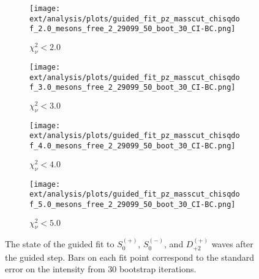 \begin{figure}[htbp]
    \centering
    \begin{subfigure}{0.45\textwidth}
        \texttt{[image: ext/analysis/plots/guided\_fit\_pz\_masscut\_chisqdof\_2.0\_mesons\_free\_2\_29099\_50\_boot\_30\_CI-BC.png]}
        \caption{$\chi^2_\nu < 2.0$}
    \end{subfigure}
    \hfill
    \begin{subfigure}{0.45\textwidth}
        \texttt{[image: ext/analysis/plots/guided\_fit\_pz\_masscut\_chisqdof\_3.0\_mesons\_free\_2\_29099\_50\_boot\_30\_CI-BC.png]}
        \caption{$\chi^2_\nu < 3.0$}
    \end{subfigure}
    \vspace{1em}
    \begin{subfigure}{0.45\textwidth}
        \texttt{[image: ext/analysis/plots/guided\_fit\_pz\_masscut\_chisqdof\_4.0\_mesons\_free\_2\_29099\_50\_boot\_30\_CI-BC.png]}
        \caption{$\chi^2_\nu < 4.0$}
    \end{subfigure}
    \hfill
    \begin{subfigure}{0.45\textwidth}
        \texttt{[image: ext/analysis/plots/guided\_fit\_pz\_masscut\_chisqdof\_5.0\_mesons\_free\_2\_29099\_50\_boot\_30\_CI-BC.png]}
        \caption{$\chi^2_\nu < 5.0$}
    \end{subfigure}

    \caption{The state of the guided fit to $S_{0}^{(+)}$, $S_{0}^{(-)}$, and $D_{+2}^{(+)}$ waves after the guided step. Bars on each fit point correspond to the standard error on the intensity from $ 30 $ bootstrap iterations.}
    \label{fig:guided-fit-all-Spn-D2p}
\end{figure}

